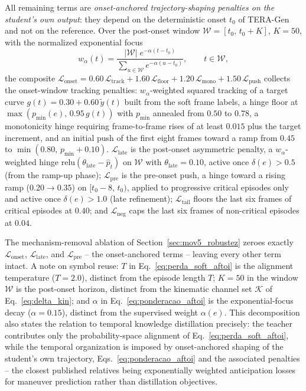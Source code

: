 \documentclass[a4paper,fleqn]{cas-dc}
\newcommand{\TERAGen}{\mbox{TERA-Gen}\xspace}
\begin{document}
{All
remaining terms are \emph{onset-anchored trajectory-shaping penalties on the
student's own output}: they depend on the deterministic onset $t_0$ of
\TERAGen and not on the reference. Over the post-onset window
$\mathcal{W} = [t_0,\, t_0{+}K]$, $K{=}50$, with the normalized exponential
focus
\begin{equation}
  w_\alpha(t) = \frac{|\mathcal{W}|\;
    e^{-\alpha (t - t_0)}}{\sum_{u \in \mathcal{W}} e^{-\alpha (u - t_0)}},
  \qquad t \in \mathcal{W},
\label{eq:ponderacao_aftoi}
\end{equation}
the composite $\mathcal{L}_{\text{onset}} = 0.60\,\mathcal{L}_{\text{track}} +
1.60\,\mathcal{L}_{\text{floor}} + 1.20\,\mathcal{L}_{\text{mono}} +
1.50\,\mathcal{L}_{\text{push}}$ collects the onset-window tracking penalties:
$w_\alpha$-weighted squared tracking of a target curve
$g(t) = 0.30 + 0.60\,\tilde{y}(t)$ built from the soft frame labels, a hinge
floor at $\max(p_{\min}(e),\, 0.95\,g(t))$ with $p_{\min}$ annealed from
$0.50$ to $0.78$, a monotonicity hinge requiring frame-to-frame rises of at
least $0.015$ plus the target increment, and an initial push of the first
eight frames toward a ramp from $0.45$ to $\min(0.80,\, p_{\min}{+}0.10)$.
$\mathcal{L}_{\text{late}}$ is the post-onset asymmetric penalty, a
$w_\alpha$-weighted hinge $\mathrm{relu}(\theta_{\text{late}} - \hat{p}_t)$ on
$\mathcal{W}$ with $\theta_{\text{late}}{=}0.10$, active once
$\delta(e) > 0.5$ (from the ramp-up phase);
$\mathcal{L}_{\text{pre}}$ is the pre-onset push, a hinge toward a rising ramp
($0.20 \rightarrow 0.35$) on $[t_0{-}8,\, t_0)$, applied to progressive
critical episodes only and active once $\delta(e) > 1.0$ (late refinement); $\mathcal{L}_{\text{tail}}$ floors the last six frames
of critical episodes at $0.40$; and $\mathcal{L}_{\text{neg}}$ caps the last
six frames of non-critical episodes at $0.04$.

The mechanism-removal ablation
of Section~\ref{sec:mov5_robustez} zeroes exactly
$\mathcal{L}_{\text{onset}}$, $\mathcal{L}_{\text{late}}$, and
$\mathcal{L}_{\text{pre}}$ -- the onset-anchored terms -- leaving every other
term intact. A note on symbol reuse: $T$ in Eq.~\ref{eq:perda_soft_aftoi} is
the alignment temperature ($T{=}2.0$), distinct from the episode length $T$;
$K{=}50$ in the window $\mathcal{W}$ is the post-onset horizon, distinct from
the kinematic channel set $\mathcal{K}$ of Eq.~\ref{eq:delta_kin}; and
$\alpha$ in Eq.~\ref{eq:ponderacao_aftoi} is the exponential-focus decay
($\alpha{=}0.15$), distinct from the supervised weight $\alpha(e)$. This decomposition also states the relation to temporal knowledge
distillation precisely: the teacher contributes only the probability-space
alignment of Eq.~\ref{eq:perda_soft_aftoi}, while the temporal organization is
imposed by onset-anchored shaping of the student's own trajectory,
Eqs.~\ref{eq:ponderacao_aftoi} and the associated penalties -- the closest
published relatives being exponentially weighted anticipation losses for
maneuver prediction rather than distillation objectives.}
\end{document}
